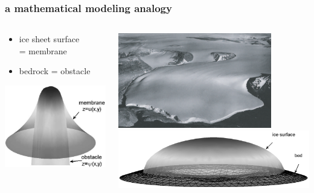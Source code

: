 \documentclass[10pt,hyperref={pdfpagelabels=true}]{beamer}
\begin{document}
\begin{frame}
  \frametitle{a mathematical modeling analogy}

\begin{columns}
\begin{column}{0.35\textwidth}
\begin{itemize}
\item ice sheet surface \\ = \alert{membrane}
\item bedrock = \alert{obstacle}
\end{itemize}
\vfill
\begin{center}
\includegraphics[width=1.1\textwidth]{classicalobs}
\end{center}
\end{column}
\begin{column}{0.65\textwidth}
\begin{center}
\includegraphics[width=0.8\textwidth]{polaris} \\
\includegraphics[width=\textwidth]{capnonflatobs}
\end{center}
\end{column}
\end{columns}
\end{frame}
\end{document}

